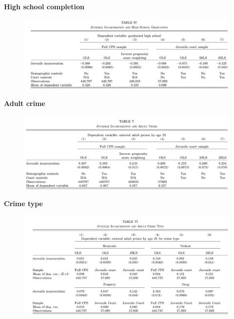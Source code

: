 \documentclass[notes=show]{beamer}
\begin{document}
\begin{frame}[plain]

	\begin{center}
	\textbf{High school completion}
	\end{center}
	
	\begin{figure}
	\includegraphics[scale=0.15]{./lecture_includes/highschool.png}
	\end{figure}
\end{frame}


\begin{frame}[plain]

	\begin{center}
	\textbf{Adult crime}
	\end{center}
	
	\begin{figure}
	\includegraphics[scale=0.2]{./lecture_includes/adult_crime.png}
	\end{figure}
\end{frame}


\begin{frame}[plain]

	\begin{center}
	\textbf{Crime type}
	\end{center}
	
	\begin{figure}
	\includegraphics[scale=0.2]{./lecture_includes/crimetype.png}
	\end{figure}
\end{frame}
\end{document}
